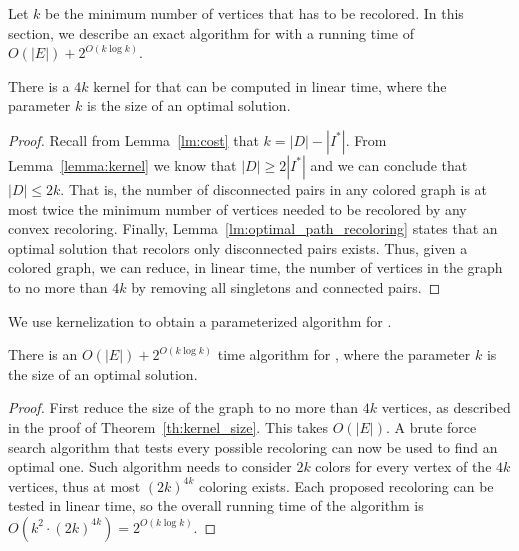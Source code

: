 \label{sec:fpt}

Let $k$ be the minimum number of vertices that has to be recolored. In this
section, we describe an exact algorithm for \TWOCR{} with a running time
of $O(|E|) + 2^{O(k \log k)}$.

\begin{theorem}
\label{th:kernel_size}
There is a $4k$ kernel for \TWOCR{} that can be computed in linear time, where the
parameter $k$ is the size of an optimal solution.
\end{theorem}

\begin{proof}
Recall from Lemma~\ref{lm:cost} that $k = |D| - |I^*|$.
From Lemma~\ref{lemma:kernel} we know that $|D| \geq 2|I^*|$ and we can
conclude that $|D| \leq 2k$.
That is, the number of disconnected pairs in any colored graph is at most twice
the minimum number of vertices needed to be recolored by any convex recoloring.
Finally, Lemma~\ref{lm:optimal_path_recoloring} states that an optimal solution
that recolors only disconnected pairs exists.
Thus, given a colored graph, we can reduce, in linear time, the number of
vertices in the graph to no more than $4k$ by removing all singletons and connected
pairs.{}
\end{proof}

We use kernelization to obtain a parameterized algorithm for \TWOCR{}.

\begin{theorem}
There is an $O(|E|) + 2^{O(k\log{k})}$ time algorithm for \TWOCR{}, where
the parameter $k$ is the size of an optimal solution.
\end{theorem}

\begin{proof}
First reduce the size of the graph to no more than $4k$ vertices, as described
in the proof of Theorem~\ref{th:kernel_size}.
This takes $O(|E|)$.
A brute force search algorithm
that tests every possible recoloring can now be used to find an optimal one.
Such algorithm needs to consider $2k$ colors for every vertex of the $4k$
vertices, thus at most $(2k)^{4k}$ coloring exists. 
Each proposed recoloring can be tested in linear time, so the overall running
time of the algorithm is $O(k^2 \cdot (2k)^{4k}) =  2^{O(k\log{k})}$.
\end{proof}


